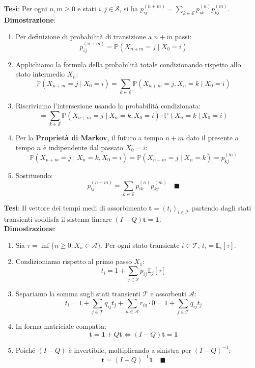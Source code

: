 \documentclass[11pt, a4paper]{report}
\theoremstyle{plain}
\theoremstyle{definition}
\theoremstyle{remark}
\newcommand{\PP}{\mathbb{P}}
\newcommand{\E}{\mathbb{E}}
\newcommand{\1}{\mathbf{1}}
\begin{document}
\begin{lavagna}[{3. Dimostrazione: Equazioni di Chapman--Kolmogorov $P^{(n+m)} = P^{(n)} P^{(m)}$}]
\textbf{Tesi}: Per ogni $n, m \ge 0$ e stati $i, j \in \mathcal{S}$, si ha $p_{ij}^{(n+m)} = \sum_{k \in \mathcal{S}} p_{ik}^{(n)} p_{kj}^{(m)}$.\\
\textbf{Dimostrazione}:
\begin{enumerate}
    \item Per definizione di probabilità di transizione a $n+m$ passi:
    \[ p_{ij}^{(n+m)} = \PP(X_{n+m} = j \mid X_0 = i) \]
    \item Applichiamo la formula della probabilità totale condizionando rispetto allo stato intermedio $X_n$:
    \[ \PP(X_{n+m} = j \mid X_0 = i) = \sum_{k \in \mathcal{S}} \PP(X_{n+m} = j, X_n = k \mid X_0 = i) \]
    \item Riscriviamo l'intersezione usando la probabilità condizionata:
    \[ = \sum_{k \in \mathcal{S}} \PP(X_{n+m} = j \mid X_n = k, X_0 = i) \cdot \PP(X_n = k \mid X_0 = i) \]
    \item Per la \textbf{Proprietà di Markov}, il futuro a tempo $n+m$ dato il presente a tempo $n$ è indipendente dal passato $X_0 = i$:
    \[ \PP(X_{n+m} = j \mid X_n = k, X_0 = i) = \PP(X_{n+m} = j \mid X_n = k) = p_{kj}^{(m)} \]
    \item Sostituendo:
    \[ p_{ij}^{(n+m)} = \sum_{k \in \mathcal{S}} p_{ik}^{(n)} p_{kj}^{(m)} \quad \blacksquare \]
\end{enumerate}
\end{lavagna}

\begin{lavagna}[{4. Dimostrazione: Tempo Medio di Assorbimento $\mathbf{t} = (I-Q)^{-1}\mathbf{1}$}]
\textbf{Tesi}: Il vettore dei tempi medi di assorbimento $\mathbf{t} = (t_i)_{i \in \mathcal{T}}$ partendo dagli stati transienti soddisfa il sistema lineare $(I-Q)\mathbf{t} = \mathbf{1}$.\\
\textbf{Dimostrazione}:
\begin{enumerate}
    \item Sia $\tau = \inf\{n \ge 0 : X_n \in \mathcal{A}\}$. Per ogni stato transiente $i \in \mathcal{T}$, $t_i = \E_i[\tau]$.
    \item Condizioniamo rispetto al primo passo $X_1$:
    \[ t_i = 1 + \sum_{j \in \mathcal{S}} p_{ij} \E_j[\tau] \]
    \item Separiamo la somma sugli stati transienti $\mathcal{T}$ e assorbenti $\mathcal{A}$:
    \[ t_i = 1 + \sum_{j \in \mathcal{T}} q_{ij} t_j + \sum_{a \in \mathcal{A}} r_{ia} \cdot 0 = 1 + \sum_{j \in \mathcal{T}} q_{ij} t_j \]
    \item In forma matriciale compatta:
    \[ \mathbf{t} = \mathbf{1} + Q \mathbf{t} \iff (I - Q)\mathbf{t} = \mathbf{1} \]
    \item Poiché $(I-Q)$ è invertibile, moltiplicando a sinistra per $(I-Q)^{-1}$:
    \[ \mathbf{t} = (I - Q)^{-1}\mathbf{1} \quad \blacksquare \]
\end{enumerate}
\end{lavagna}
\end{document}
